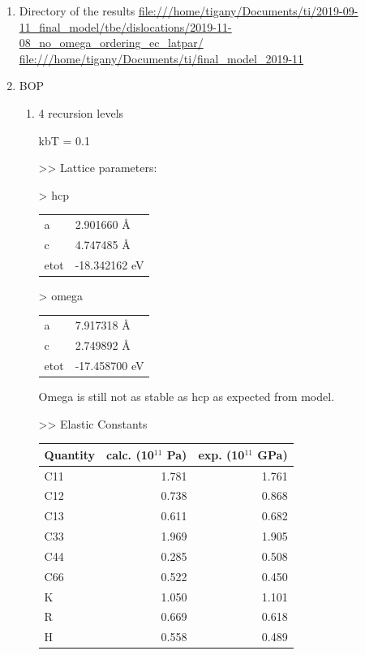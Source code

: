 \documentclass[11pt]{article}
\begin{document}
\begin{enumerate}
\item Directory of the results
\label{sec:org288b0b3}
\url{file:///home/tigany/Documents/ti/2019-09-11\_final\_model/tbe/dislocations/2019-11-08\_no\_omega\_ordering\_ec\_latpar/}
\url{file:///home/tigany/Documents/ti/final\_model\_2019-11}

\item BOP
\label{sec:org6045dbb}

\begin{enumerate}
\item 4 recursion levels
\label{sec:orgf6fabec}

kbT = 0.1

>> Lattice parameters:

> hcp
\begin{center}
\begin{tabular}{ll}
a & 2.901660  \AA{}\\
c & 4.747485  \AA{}\\
etot & -18.342162  eV\\
\end{tabular}
\end{center}

> omega
\begin{center}
\begin{tabular}{ll}
a & 7.917318  \AA{}\\
c & 2.749892 \AA{}\\
etot & -17.458700 eV\\
\end{tabular}
\end{center}

Omega is still not as stable as hcp as expected from model. 


>> Elastic Constants

\begin{center}
\begin{tabular}{lrr}
Quantity & calc. (10\(^{\text{11}}\) Pa) & exp. (10\(^{\text{11}}\) GPa)\\
\hline
C11 & 1.781 & 1.761\\
C12 & 0.738 & 0.868\\
C13 & 0.611 & 0.682\\
C33 & 1.969 & 1.905\\
C44 & 0.285 & 0.508\\
C66 & 0.522 & 0.450\\
K & 1.050 & 1.101\\
R & 0.669 & 0.618\\
H & 0.558 & 0.489\\
\end{tabular}
\end{center}
\end{enumerate}
\end{enumerate}
\end{document}
